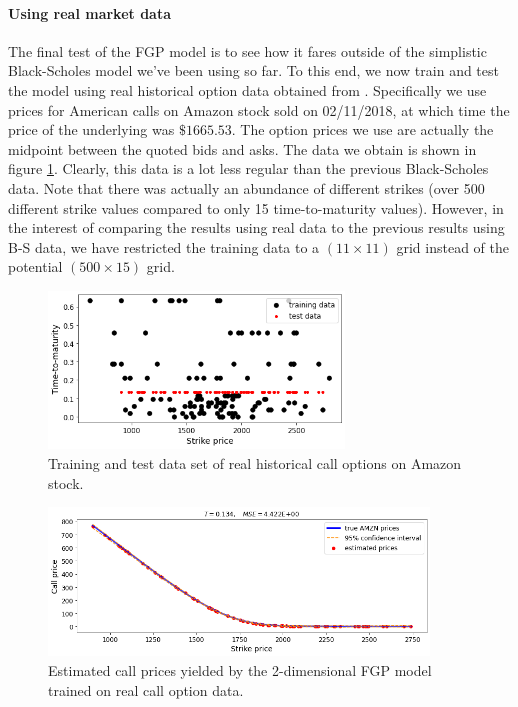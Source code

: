 \documentclass[a4paper,12pt]{article}
\begin{document}
\paragraph{Using real market data}
The final test of the FGP model is to see how it fares outside of the simplistic Black-Scholes model we've been using so far. To this end, we now train and test the model using real historical option data obtained from \cite{histoptiondata}. Specifically we use prices for American calls on Amazon stock sold on 02/11/2018, at which time the price of the underlying was $\$1665.53$. The option prices we use are actually the midpoint between the quoted bids and asks. The data we obtain is shown in figure \ref{fig:real_data_amzn_grid}. Clearly, this data is a lot less regular than the previous Black-Scholes data. Note that there was actually an abundance of different strikes (over 500 different strike values compared to only 15 time-to-maturity values). However, in the interest of comparing the results using real data to the previous results using B-S data, we have restricted the training data to a $(11 \times 11)$ grid instead of the potential $(500 \times 15)$ grid.
\begin{figure} [H]
    \centering
    \includegraphics[width=0.7\textwidth]{real_data_amzn_grid.png}
    \caption{Training and test data set of real historical call options on Amazon stock.}
    \label{fig:real_data_amzn_grid}
\end{figure}
\begin{figure} [H]
    \centering
    \includegraphics[width=0.9\textwidth]{real_data_amzn_call.png}
    \caption{Estimated call prices yielded by the 2-dimensional FGP model trained on real call option data.}
    \label{fig:real_data_amzn_call}
\end{figure}
\end{document}
